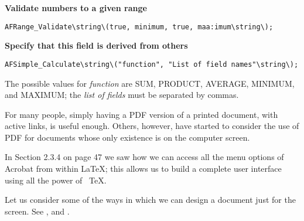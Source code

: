 \textbf{Validate numbers to a given range} 

\begin{verbatim}
AFRange_Validate\string\(true, minimum, true, maa:imum\string\); 
\end{verbatim}

\textbf{Specify that this field is derived from others} 

\begin{verbatim}
AFSimple_Calculate\string\("function", "List of field names"\string\); 
\end{verbatim}

The possible values for \emph{function} are SUM, PRODUCT, AVERAGE, MINIMUM, and
MAXIMUM; the \emph{list of fields} must be separated by commas. 

 

For many people, simply having a PDF version of a printed document, with active 
links, is useful enough. Others, however, have started to consider the use of PDF 
for documents whose only existence is on the computer screen. 

In Section 2.3.4 on page 47 we saw how we can access all the menu options of 
Acrobat from within \LaTeX; this allows us to build a complete user interface using 
all the power of \ \TeX. 

Let us consider some of the ways in which we can design a document just
for the screen. See ,  and . 

